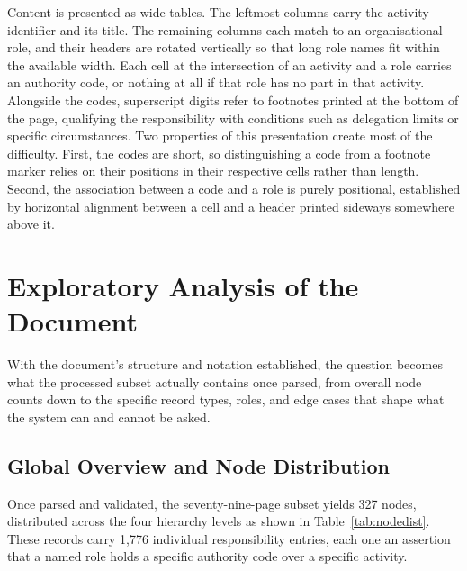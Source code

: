 Content is presented as wide tables. The leftmost columns carry the activity identifier and its title. The remaining columns each match to an organisational role, and their headers are rotated vertically so that long role names fit within the available width. 
Each cell at the intersection of an activity and a role carries an authority code, or nothing at all if that role has no part in that activity. Alongside the codes, superscript digits refer to footnotes printed at the bottom of the page, qualifying the responsibility with conditions such as delegation limits or specific circumstances.
Two properties of this presentation create most of the difficulty. First, the codes are short, so distinguishing a code from a footnote marker relies on their positions in their respective cells rather than length. Second, the association between a code and a role is purely positional, established by horizontal alignment between a cell and a header printed sideways somewhere above it.

\section{Exploratory Analysis of the Document}

With the document's structure and notation established, the question becomes what the
processed subset actually contains once parsed, from overall node counts down to the
specific record types, roles, and edge cases that shape what the system can and cannot be
asked.

\subsection{Global Overview and Node Distribution}

Once parsed and validated, the seventy-nine-page subset yields 327 nodes, distributed across the four hierarchy levels as shown in Table~\ref{tab:nodedist}. These records carry 1,776 individual responsibility entries, each one an assertion that a named role holds a specific authority code over a specific activity.

